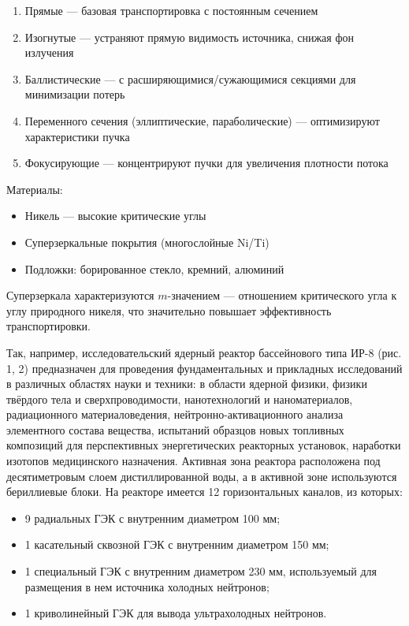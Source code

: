 \documentclass[a4paper]{article}
\begin{document}
\begin{enumerate}
    \item Прямые --- базовая транспортировка с постоянным сечением
    
    \item Изогнутые --- устраняют прямую видимость источника, снижая фон излучения
    
    \item Баллистические --- с расширяющимися/сужающимися секциями для минимизации потерь
    
    \item Переменного сечения (эллиптические, параболические) --- оптимизируют характеристики пучка
    
    \item Фокусирующие --- концентрируют пучки для увеличения плотности потока
\end{enumerate}

Материалы:

\begin{itemize}
    \item Никель --- высокие критические углы
    
    \item Суперзеркальные покрытия (многослойные Ni/Ti)
    
    \item Подложки: борированное стекло, кремний, алюминий
\end{itemize}

Суперзеркала характеризуются $m$-значением --- отношением критического угла к углу природного никеля, что значительно повышает эффективность транспортировки.

\bigskip

Так, например, исследовательский ядерный реактор бассейнового типа ИР-8 (рис. 1, 2) предназначен для проведения фундаментальных и прикладных исследований в различных областях науки и техники: в области ядерной физики, физики твёрдого тела и сверхпроводимости, нанотехнологий и наноматериалов, радиационного материаловедения, нейтронно-активационного анализа элементного состава вещества, испытаний образцов новых топливных композиций для перспективных энергетических реакторных установок, наработки изотопов медицинского назначения. Активная зона реактора расположена под десятиметровым слоем дистиллированной воды, а в активной зоне используются бериллиевые блоки. На реакторе имеется 12 горизонтальных каналов, из которых:

\begin{itemize}
    \item 9 радиальных ГЭК с внутренним диаметром 100 мм;
    
    \item 1 касательный сквозной ГЭК с внутренним диаметром 150 мм;
    
    \item 1 специальный ГЭК с внутренним диаметром 230 мм, используемый для размещения в нем источника холодных нейтронов;
    
    \item 1 криволинейный ГЭК для вывода ультрахолодных нейтронов.
\end{itemize}
\end{document}
